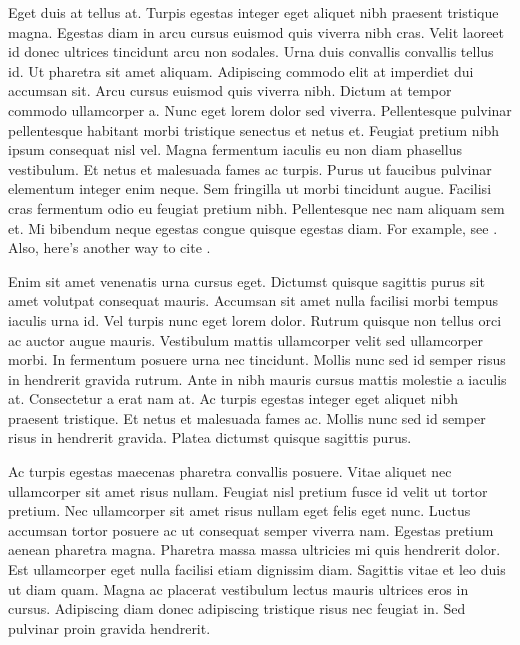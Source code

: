 Eget duis at tellus at. Turpis egestas integer eget aliquet nibh praesent
tristique magna. Egestas diam in arcu cursus euismod quis viverra nibh cras.
Velit laoreet id donec ultrices tincidunt arcu non sodales. Urna duis
convallis convallis tellus id. Ut pharetra sit amet aliquam. Adipiscing
commodo elit at imperdiet dui accumsan sit. Arcu cursus euismod quis viverra
nibh. Dictum at tempor commodo ullamcorper a. Nunc eget lorem dolor sed
viverra. Pellentesque pulvinar pellentesque habitant morbi tristique senectus
et netus et. Feugiat pretium nibh ipsum consequat nisl vel. Magna fermentum
iaculis eu non diam phasellus vestibulum. Et netus et malesuada fames ac
turpis. Purus ut faucibus pulvinar elementum integer enim neque. Sem
fringilla ut morbi tincidunt augue. Facilisi cras fermentum odio eu feugiat
pretium nibh. Pellentesque nec nam aliquam sem et. Mi bibendum neque egestas
congue quisque egestas diam. For example, see \citet{fama1992cross}. Also, here's another
way to cite \citep{sharpe1964capital}.


Enim sit amet venenatis urna cursus eget. Dictumst quisque sagittis purus sit
amet volutpat consequat mauris. Accumsan sit amet nulla facilisi morbi tempus
iaculis urna id. Vel turpis nunc eget lorem dolor. Rutrum quisque non tellus
orci ac auctor augue mauris. Vestibulum mattis ullamcorper velit sed
ullamcorper morbi. In fermentum posuere urna nec tincidunt. Mollis nunc sed
id semper risus in hendrerit gravida rutrum. Ante in nibh mauris cursus
mattis molestie a iaculis at. Consectetur a erat nam at. Ac turpis egestas
integer eget aliquet nibh praesent tristique. Et netus et malesuada fames ac.
Mollis nunc sed id semper risus in hendrerit gravida. Platea dictumst quisque
sagittis purus.

Ac turpis egestas maecenas pharetra convallis posuere. Vitae aliquet nec
ullamcorper sit amet risus nullam. Feugiat nisl pretium fusce id velit ut
tortor pretium. Nec ullamcorper sit amet risus nullam eget felis eget nunc.
Luctus accumsan tortor posuere ac ut consequat semper viverra nam. Egestas
pretium aenean pharetra magna. Pharetra massa massa ultricies mi quis
hendrerit dolor. Est ullamcorper eget nulla facilisi etiam dignissim diam.
Sagittis vitae et leo duis ut diam quam. Magna ac placerat vestibulum lectus
mauris ultrices eros in cursus. Adipiscing diam donec adipiscing tristique
risus nec feugiat in. Sed pulvinar proin gravida hendrerit.


